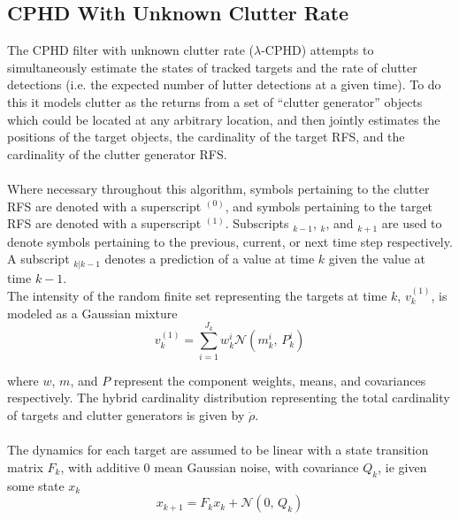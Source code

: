 \documentclass{article}
\begin{document}
\subsection*{CPHD With Unknown Clutter Rate}
The CPHD filter with unknown clutter rate ($\lambda$-CPHD)\cite{cphd} attempts to simultaneously estimate the states of tracked targets and the rate of clutter detections (i.e. the expected number of lutter detections at a given time). To do this it models clutter as the returns from a set of ``clutter generator'' objects which could be located at any arbitrary location, and then jointly estimates the positions of the target objects, the cardinality of the target RFS, and the cardinality of the clutter generator RFS. \\
\\
Where necessary throughout this algorithm, symbols pertaining to the clutter RFS are denoted with a superscript $^{(0)}$, and symbols pertaining to the target RFS are denoted with a superscript $^{(1)}$. Subscripts $_{k-1}$, $_k$, and $_{k+1}$ are used to denote symbols pertaining to the previous, current, or next time step respectively. A subscript $_{k|k-1}$ denotes a prediction of a value at time $k$ given the value at time $k-1$.
\\
The intensity of the random finite set representing the targets at time $k$, $v^{(1)}_k$, is modeled as a Gaussian mixture
\begin{equation}
  \label{eq:vk}
  v^{(1)}_k = \sum_{i = 1}^{J_k}w_k^i \mathcal{N}(m_k^i,\,P_k^i)
\end{equation}

where $w$, $m$, and $P$ represent the component weights, means, and covariances respectively. The hybrid cardinality distribution representing the total cardinality of targets and clutter generators is given by $\ddot{\rho}$. \\
\\
The dynamics for each target are assumed to be linear with a state transition matrix $F_k$, with additive 0 mean Gaussian noise, with covariance $Q_k$, ie given some state $x_k$
\begin{equation}
  \label{eq:tgt_dynamics}
  x_{k+1} = F_kx_k + \mathcal{N}(0,\,Q_k)
\end{equation}
\end{document}
